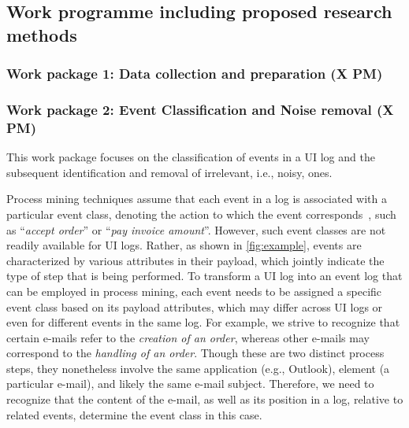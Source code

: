 \subsection{Work programme including proposed research methods}


\subsubsection{Work package 1: Data collection and preparation  (X PM)}
\label{sec:wp1}


\subsubsection{Work package 2:  Event Classification and Noise removal (X PM)}
\label{sec:wp2}

This work package focuses on the classification of events in a UI log and the subsequent identification and  removal of irrelevant, i.e., noisy, ones.

Process mining techniques assume that each event in a log is associated with a particular event class, denoting the action to which the event corresponds~\cite{van2016data}, such as ``\emph{accept order}'' or ``\emph{pay invoice amount}''.
However, such event classes are not readily available for UI logs. Rather, as shown in  \autoref{fig:example}, events are characterized by various attributes in their payload, which jointly indicate the type of step that is being performed. 
To transform a UI log into an event log that can be employed in process mining, 
each event needs to be assigned a specific event class based on its payload attributes, which may differ across UI logs or even for different events in the same log. For example, we strive to recognize that certain e-mails refer to the \emph{creation of an order}, whereas other e-mails may correspond to the \emph{handling of an order}. Though these are  two distinct process steps, they nonetheless involve the same application (e.g., Outlook), element (a particular e-mail), and likely the same e-mail subject. Therefore, we need to recognize that the content of the e-mail, as well as its position in a log, relative to related events, determine the event class in this case.

